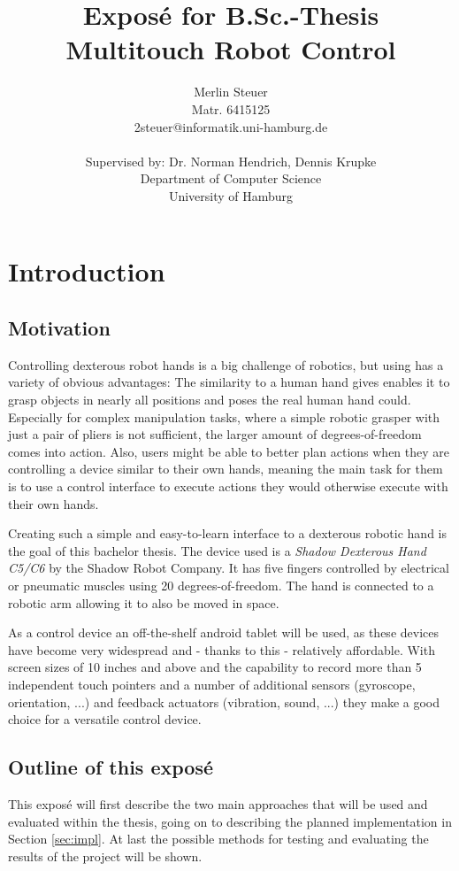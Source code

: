 \documentclass[a4paper]{article}
\title{Exposé for B.Sc.-Thesis \\
Multitouch Robot Control}
\author{Merlin Steuer \\ Matr. 6415125 \\ 2steuer@informatik.uni-hamburg.de \\
\\ Supervised by: Dr. Norman Hendrich, Dennis Krupke \\ 
Department of Computer Science \\ 
University of Hamburg}
\begin{document}
\maketitle

\tableofcontents

\pagebreak

\section{Introduction}
\subsection{Motivation}
Controlling dexterous robot hands is a big challenge of robotics, but using has a variety of obvious advantages: The similarity to a human hand gives enables it to grasp objects in nearly all positions and poses the real human hand could. Especially for complex manipulation tasks, where a simple robotic grasper with just a pair of pliers is not sufficient, the larger amount of degrees-of-freedom comes into action. Also, users might be able to better plan actions when they are controlling a device similar to their own hands, meaning the main task for them is to use a control interface to execute actions they would otherwise execute with their own hands.

Creating such a simple and easy-to-learn interface to a dexterous robotic hand is the goal of this bachelor thesis. The device used is a \textit{Shadow Dexterous Hand C5/C6} by the Shadow Robot Company. It has five fingers controlled by electrical or pneumatic muscles using 20 degrees-of-freedom\cite{web/robothand/spec}. The hand is connected to a robotic arm allowing it to also be moved in space.

As a control device an off-the-shelf android tablet will be used, as these devices have become very widespread and - thanks to this - relatively affordable. With screen sizes of 10 inches and above and the capability to record more than 5 independent touch pointers and a number of additional sensors (gyroscope, orientation, ...) and feedback actuators (vibration, sound, ...) they make a good choice for a versatile control device.

\subsection{Outline of this exposé}

This exposé will first describe the two main approaches that will be used and evaluated within the thesis, going on to describing the planned implementation in Section \ref{sec:impl}. At last the possible methods for testing and evaluating the results of the project will be shown.
\end{document}
